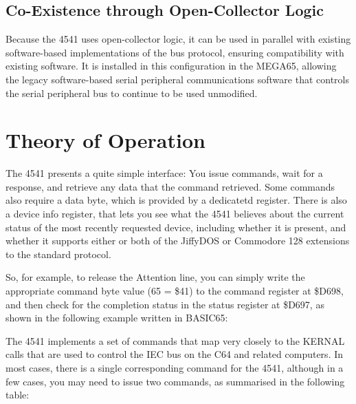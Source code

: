 \subsection{Co-Existence through Open-Collector Logic}

Because the 4541 uses open-collector
logic, it can be used in parallel with existing software-based
implementations of the bus protocol, ensuring compatibility with
existing software.  It is installed in this configuration in the
MEGA65, allowing the legacy software-based serial peripheral
communications software that controls the serial peripheral bus to
continue to be used unmodified. 

\section{Theory of Operation}

The 4541 presents a quite simple interface: You issue commands, wait
for a response, and retrieve any data that the command
retrieved.  Some commands also require a data byte, which is provided
by a dedicatetd register.  There is also a device info register, that lets you see
what the 4541 believes about the current status of the most recently
requested device, including whether it is present, and whether it
supports either or both of the JiffyDOS{\texttrademark} or
Commodore{\textrademark} 128 extensions to the standard protocol.

So, for example, to release the Attention line, you can simply write
the appropriate command byte value (65 = \$41) to the command register
at \$D698, and then check for the completion status in the status
register at \$D697, as shown in the following example written in
BASIC65:


The 4541 implements a set of commands that map very closely to the
KERNAL calls that are used to control the IEC bus on the C64 and
related computers.  In most cases, there is a single corresponding
command for the 4541, although in a few cases, you may need to issue
two commands, as summarised in the following table:

